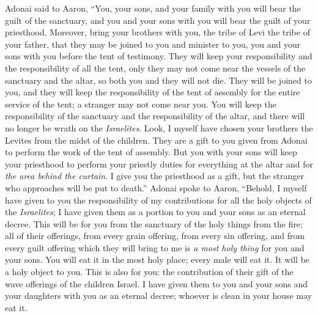\begin{biblechapter} %
 Adonai said to Aaron, “You, your sons, and your family with you will bear the guilt of the sanctuary, and you and your sons with you will bear the guilt of your priesthood.
\verse Moreover, bring your brothers with you, the tribe of Levi the tribe of your father, that they may be joined to you and minister to you, you and your sons with you before the tent of testimony.
\verse They will keep your responsibility and the responsibility of all the tent, only they may not come near the vessels of the sanctuary and the altar, so both you and they will not die.
\verse They will be joined to you, and they will keep the responsibility of the tent of assembly for the entire service of the tent; a stranger may not come near you.
\verse You will keep the responsibility of the sanctuary and the responsibility of the altar, and there will no longer be wrath on the \textit{Israelites}.
\verse Look, I myself have chosen your brothers the Levites from the midst of the children. They are a gift to you given from Adonai to perform the work of the tent of assembly.
\verse But you with your sons will keep your priesthood to perform your priestly duties for everything at the altar and for \textit{the area behind the curtain}. I give you the priesthood as a gift, but the stranger who approaches will be put to death.”
 Adonai spoke to Aaron, “Behold, I myself have given to you the responsibility of my contributions for all the holy objects of the \textit{Israelites}; I have given them as a portion to you and your sons as an eternal decree.
\verse This will be for you from the sanctuary of the holy things from the fire; all of their offerings, from every grain offering, from every sin offering, and from every guilt offering which they will bring to me is \textit{a most holy thing} for you and your sons.
\verse You will eat it in the most holy place; every male will eat it. It will be a holy object to you.
\verse This is also for you: the contribution of their gift of the wave offerings of the children Israel. I have given them to you and your sons and your daughters with you as an eternal decree; whoever is clean in your house may eat it.

\end{biblechapter}
